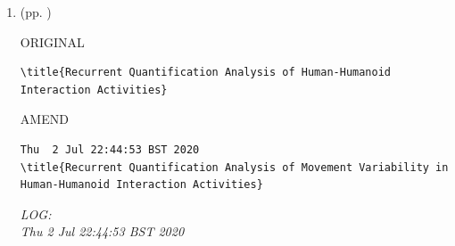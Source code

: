 \documentclass[10pt]{article}
\begin{document}
\begin{enumerate}

\item  (pp. ) 

ORIGINAL
\begin{verbatim}
\title{Recurrent Quantification Analysis of Human-Humanoid Interaction Activities}
\end{verbatim}

AMEND 
\begin{verbatim}
Thu  2 Jul 22:44:53 BST 2020
\title{Recurrent Quantification Analysis of Movement Variability in Human-Humanoid Interaction Activities}
\end{verbatim}




	\textit{
	LOG:\\ 
	Thu  2 Jul 22:44:53 BST 2020
	}
	\\




\end{enumerate}
\end{document}

